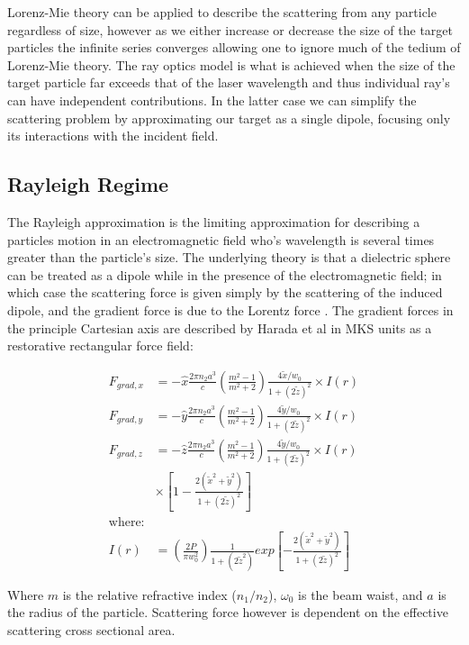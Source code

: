 Lorenz-Mie theory can be applied to describe the scattering from any particle regardless of size, however as we either increase or decrease the size of the target particles the infinite series converges allowing one to ignore much of the tedium of Lorenz-Mie theory. The ray optics model is what is achieved when the size of the target particle far exceeds that of the laser wavelength and thus individual ray's can have independent contributions. In the latter case we can simplify the scattering problem by approximating our target as a single dipole, focusing only its interactions with the incident field.

\subsection{Rayleigh Regime}
The Rayleigh approximation is the limiting approximation for describing a particles motion in an electromagnetic field who's wavelength is several times greater than the particle's size. The underlying theory is that a dielectric sphere can be treated as a dipole while in the presence of the electromagnetic field; in which case the scattering force is given simply by the scattering of the induced dipole, and the gradient force is due to the Lorentz force \cite{Gordon1973}. The gradient forces in the principle Cartesian axis are described by Harada et al \cite{YasuhiroHarada1996} in MKS units as a restorative rectangular force field:

\begin{align}
	F_{grad,x} &=-\hat{x} \frac{2\pi n_2 a^3}{c}
	\left(\frac{m^2-1}{m^2+2}\right) \frac{4\tilde{x}/w_0}{1+(2\tilde{z})^2} \times I(r) \\
	F_{grad,y} &=-\hat{y} \frac{2\pi n_2 a^3}{c}
	\left(\frac{m^2-1}{m^2+2}\right) \frac{4\tilde{y}/w_0}{1+(2\tilde{z})^2} \times I(r) \\
	F_{grad,z} &=-\hat{z} \frac{2\pi n_2 a^3}{c}
	\left(\frac{m^2-1}{m^2+2}\right) \frac{4\tilde{y}/w_0}{1+(2\tilde{z})^2} \nonumber \times I(r) \\ 
	& \times \left[1-\frac{2(\tilde{x}^2+\tilde{y}^2)}{1+(2\tilde{z})^2} \right] \\
	\text{where:} \nonumber \\
	I(r) &= \left(\frac{2P}{\pi w_0^2}\right) \frac{1}{1+(2\tilde{z}^2)} 
	exp \left[ - \frac{2(\tilde{x}^2+\tilde{y}^2)}{1+(2\tilde{z})^2} \right]
\end{align}

Where $m$ is the relative refractive index ($n_1/n_2$), $\omega_0$ is the beam waist, and $a$ is the radius of the particle. Scattering force however is dependent on the effective scattering cross sectional area. 

